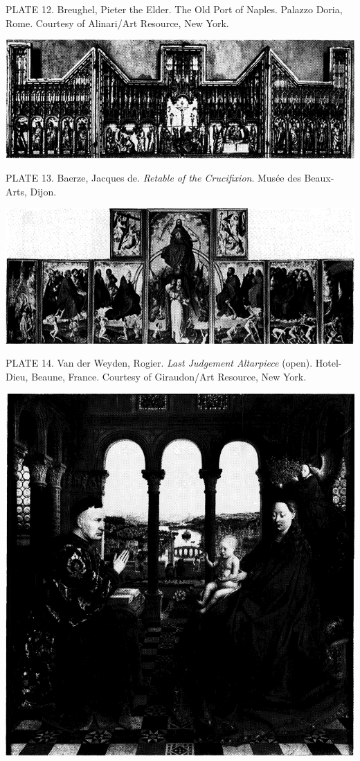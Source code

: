 PLATE 12. Breughel, Pieter the Elder. The Old Port of Naples. Palazzo
Doria, Rome. Courtesy of Alinari/Art Resource, New York.

\protect\hypertarget{20_ILLUSTRATIONS_FOLLOW_PAGE.xhtmlux5cux23id_14}{}{}\includegraphics{include/html/images/334_1.png}

PLATE 13. Baerze, Jacques de. \emph{Retable of the Crucifixion}. Musée
des Beaux-Arts, Dijon.

\protect\hypertarget{20_ILLUSTRATIONS_FOLLOW_PAGE.xhtmlux5cux23id_2298}{}{}\includegraphics{include/html/images/334_2.png}

PLATE 14. Van der Weyden, Rogier. \emph{Last Judgement Altarpiece}
(open). Hotel-Dieu, Beaune, France. Courtesy of Giraudon/Art Resource,
New York.

\protect\hypertarget{20_ILLUSTRATIONS_FOLLOW_PAGE.xhtmlux5cux23id_15}{}{}\includegraphics{include/html/images/335_1.png}

